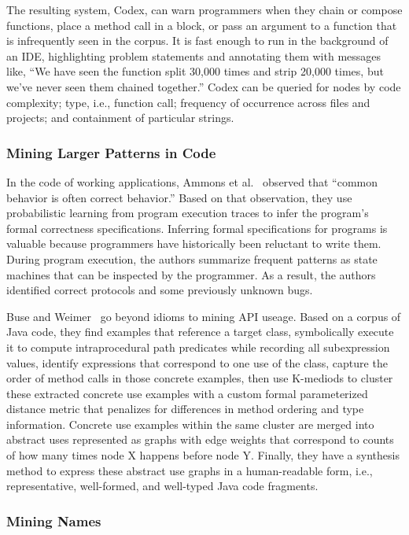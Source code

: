 The resulting system, Codex, can warn programmers when they chain or compose functions, place a method call in a block, or pass an argument to a function that is infrequently seen in the corpus. It is fast enough to run in the background of an IDE, highlighting problem statements and annotating them with messages like, “We have seen the function split 30,000 times and strip 20,000 times, but we’ve never seen them chained together.” Codex can be queried for nodes by code complexity; type, i.e., function call; frequency of occurrence across files and projects; and containment of particular strings.

\subsubsection{Mining Larger Patterns in Code}

In the code of working applications, Ammons et al.~\cite{ammons2002mining} observed that “common behavior is often correct behavior.” Based on that observation, they use probabilistic learning from program execution traces to infer the program’s formal correctness specifications. Inferring formal specifications for programs is valuable because programmers have historically been reluctant to write them. During program execution, the authors summarize frequent patterns as state machines that can be inspected by the programmer. As a result, the authors identified correct protocols and some previously unknown bugs.

Buse and Weimer~\cite{buse2012synthesizing} go beyond idioms to mining API useage. Based on a corpus of Java code, they find examples that reference a target class, symbolically execute it to compute intraprocedural path predicates while recording all subexpression values, identify expressions that correspond to one use of the class, capture the order of method calls in those concrete examples, then use K-mediods to cluster these extracted concrete use examples with a custom formal parameterized distance metric that penalizes for differences in method ordering and type information. Concrete use examples within the same cluster are merged into abstract uses represented as graphs with edge weights that correspond to counts of how many times node X happens before node Y. Finally, they have a synthesis method to express these abstract use graphs in a human-readable form, i.e., representative, well-formed, and well-typed Java code fragments.

\subsubsection{Mining Names}

